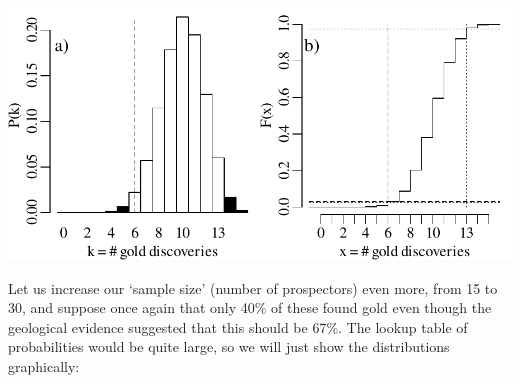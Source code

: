 \noindent\begin{minipage}[t][][b]{.6\textwidth}
  \includegraphics[width=\textwidth]{../figures/2sidedbinomialrejection15.pdf}\\
\end{minipage}
\begin{minipage}[t][][t]{.4\textwidth}
  \label{fig:2sidedbinomialrejection15}
\end{minipage}

Let us increase our `sample size' (number of prospectors) even more,
from 15 to 30, and suppose once again that only 40\% of these found
gold even though the geological evidence suggested that this should be
67\%. The lookup table of probabilities would be quite large, so we
will just show the distributions graphically:\\

